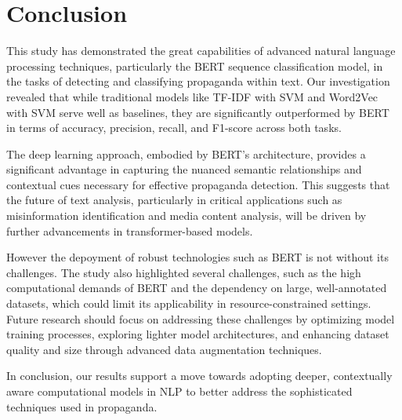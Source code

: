 \documentclass[twocolumn]{article}
\begin{document}
\section{Conclusion}
This study has demonstrated the great capabilities of advanced natural language processing techniques, particularly the BERT sequence classification model, in the tasks of detecting and classifying propaganda within text. Our investigation revealed that while traditional models like TF-IDF with SVM and Word2Vec with SVM serve well as baselines, they are significantly outperformed by BERT in terms of accuracy, precision, recall, and F1-score across both tasks.

The deep learning approach, embodied by BERT’s architecture, provides a significant advantage in capturing the nuanced semantic relationships and contextual cues necessary for effective propaganda detection. This suggests that the future of text analysis, particularly in critical applications such as misinformation identification and media content analysis, will be driven by further advancements in transformer-based models.

However the depoyment of robust technologies such as BERT is not without its challenges. The study also highlighted several challenges, such as the high computational demands of BERT and the dependency on large, well-annotated datasets, which could limit its applicability in resource-constrained settings. Future research should focus on addressing these challenges by optimizing model training processes, exploring lighter model architectures, and enhancing dataset quality and size through advanced data augmentation techniques.

In conclusion, our results support a move towards adopting deeper, contextually aware computational models in NLP to better address the sophisticated techniques used in propaganda.



\end{document}
